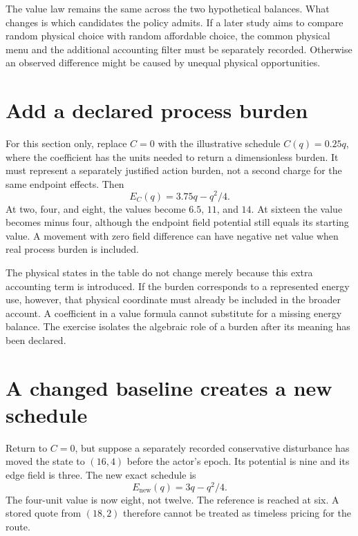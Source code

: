 The value law remains the same across the two hypothetical balances. What changes is which candidates the policy admits. If a later study aims to compare random physical choice with random affordable choice, the common physical menu and the additional accounting filter must be separately recorded. Otherwise an observed difference might be caused by unequal physical opportunities.

\section{Add a declared process burden}

For this section only, replace \(C=0\) with the illustrative schedule \(C(q)=0.25q\), where the coefficient has the units needed to return a dimensionless burden. It must represent a separately justified action burden, not a second charge for the same endpoint effects. Then
\begin{equation}
E_C(q)=3.75q-q^2/4.
\end{equation}
At two, four, and eight, the values become \(6.5\), \(11\), and \(14\). At sixteen the value becomes minus four, although the endpoint field potential still equals its starting value. A movement with zero field difference can have negative net value when real process burden is included.

The physical states in the table do not change merely because this extra accounting term is introduced. If the burden corresponds to a represented energy use, however, that physical coordinate must already be included in the broader account. A coefficient in a value formula cannot substitute for a missing energy balance. The exercise isolates the algebraic role of a burden after its meaning has been declared.

\section{A changed baseline creates a new schedule}

Return to \(C=0\), but suppose a separately recorded conservative disturbance has moved the state to \((16,4)\) before the actor's epoch. Its potential is nine and its edge field is three. The new exact schedule is
\begin{equation}
E_{\mathrm{new}}(q)=3q-q^2/4.
\end{equation}
The four-unit value is now eight, not twelve. The reference is reached at six. A stored quote from \((18,2)\) therefore cannot be treated as timeless pricing for the route.

